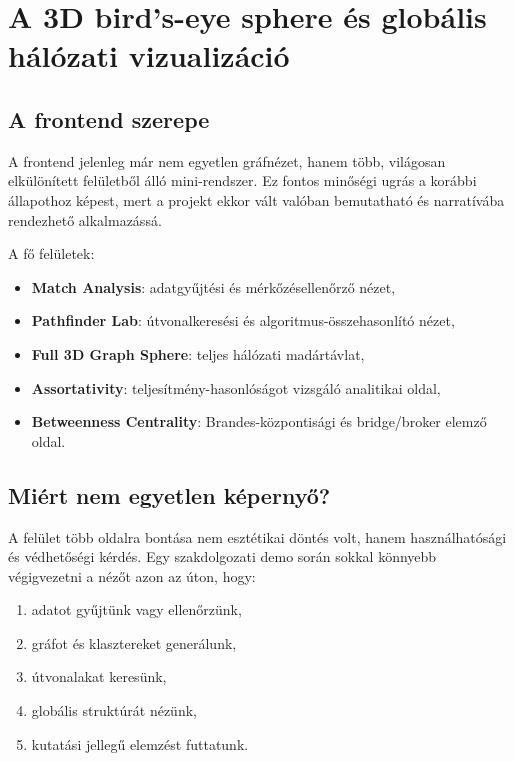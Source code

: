﻿\documentclass[a4paper,12pt]{report}
\begin{document}
\chapter{A 3D bird's-eye sphere és globális hálózati vizualizáció}

\section{A frontend szerepe}

A frontend jelenleg már nem egyetlen gráfnézet, hanem több, világosan elkülönített felületből álló mini-rendszer. Ez fontos minőségi ugrás a korábbi állapothoz képest, mert a projekt ekkor vált valóban bemutatható és narratívába rendezhető alkalmazássá.

A fő felületek:

\begin{itemize}
    \item \textbf{Match Analysis}: adatgyűjtési és mérkőzésellenőrző nézet,
    \item \textbf{Pathfinder Lab}: útvonalkeresési és algoritmus-összehasonlító nézet,
    \item \textbf{Full 3D Graph Sphere}: teljes hálózati madártávlat,
    \item \textbf{Assortativity}: teljesítmény-hasonlóságot vizsgáló analitikai oldal,
    \item \textbf{Betweenness Centrality}: Brandes-központisági és bridge/broker elemző oldal.
\end{itemize}

\section{Miért nem egyetlen képernyő?}

A felület több oldalra bontása nem esztétikai döntés volt, hanem használhatósági és védhetőségi kérdés. Egy szakdolgozati demo során sokkal könnyebb végigvezetni a nézőt azon az úton, hogy:

\begin{enumerate}
    \item adatot gyűjtünk vagy ellenőrzünk,
    \item gráfot és klasztereket generálunk,
    \item útvonalakat keresünk,
    \item globális struktúrát nézünk,
    \item kutatási jellegű elemzést futtatunk.
\end{enumerate}
\end{document}
